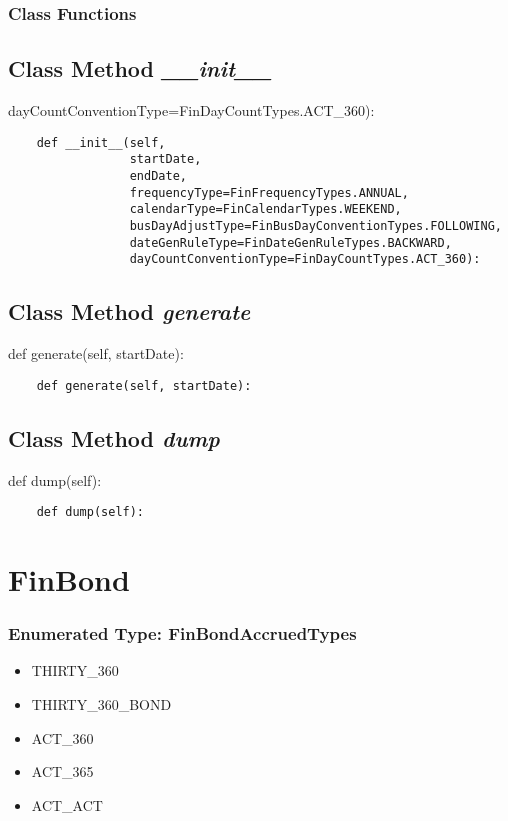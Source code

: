 \documentclass[twoside,11pt]{book}
\begin{document}
\subsubsection{Class Functions}

\subsection{Class Method {\it \_\_init\_\_}}
dayCountConventionType=FinDayCountTypes.ACT\_360):

\begin{lstlisting}
    def __init__(self,
                 startDate,
                 endDate,
                 frequencyType=FinFrequencyTypes.ANNUAL,
                 calendarType=FinCalendarTypes.WEEKEND,
                 busDayAdjustType=FinBusDayConventionTypes.FOLLOWING,
                 dateGenRuleType=FinDateGenRuleTypes.BACKWARD,
                 dayCountConventionType=FinDayCountTypes.ACT_360):
\end{lstlisting}

\subsection{Class Method {\it generate}}
def generate(self, startDate):

\begin{lstlisting}
    def generate(self, startDate):
\end{lstlisting}

\subsection{Class Method {\it dump}}
def dump(self):

\begin{lstlisting}
    def dump(self):
\end{lstlisting}

\newpage
\section{FinBond}

\subsubsection{Enumerated Type: FinBondAccruedTypes}
\begin{itemize}
\item{THIRTY\_360}
\item{THIRTY\_360\_BOND}
\item{ACT\_360}
\item{ACT\_365}
\item{ACT\_ACT}
\end{itemize}
\end{document}
